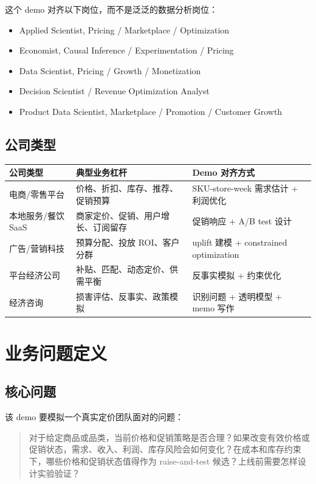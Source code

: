 \documentclass[UTF8,11pt,a4paper,fontset=none]{ctexart}
\begin{document}
这个 demo 对齐以下岗位，而不是泛泛的数据分析岗位：

\begin{itemize}
  \item Applied Scientist, Pricing / Marketplace / Optimization
  \item Economist, Causal Inference / Experimentation / Pricing
  \item Data Scientist, Pricing / Growth / Monetization
  \item Decision Scientist / Revenue Optimization Analyst
  \item Product Data Scientist, Marketplace / Promotion / Customer Growth
\end{itemize}

\subsection{公司类型}

\begin{tabularx}{\textwidth}{L{3.2cm}Y Y}
\toprule
公司类型 & 典型业务杠杆 & Demo 对齐方式 \\
\midrule
电商/零售平台 & 价格、折扣、库存、推荐、促销预算 & SKU-store-week 需求估计 + 利润优化 \\
本地服务/餐饮 SaaS & 商家定价、促销、用户增长、订阅留存 & 促销响应 + A/B test 设计 \\
广告/营销科技 & 预算分配、投放 ROI、客户分群 & uplift 建模 + constrained optimization \\
平台经济公司 & 补贴、匹配、动态定价、供需平衡 & 反事实模拟 + 约束优化 \\
经济咨询 & 损害评估、反事实、政策模拟 & 识别问题 + 透明模型 + memo 写作 \\
\bottomrule
\end{tabularx}

\section{业务问题定义}

\subsection{核心问题}

该 demo 要模拟一个真实定价团队面对的问题：

\begin{quote}
对于给定商品或品类，当前价格和促销策略是否合理？如果改变有效价格或促销状态，需求、收入、利润、库存风险会如何变化？在成本和库存约束下，哪些价格和促销状态值得作为 raise-and-test 候选？上线前需要怎样设计实验验证？
\end{quote}
\end{document}
